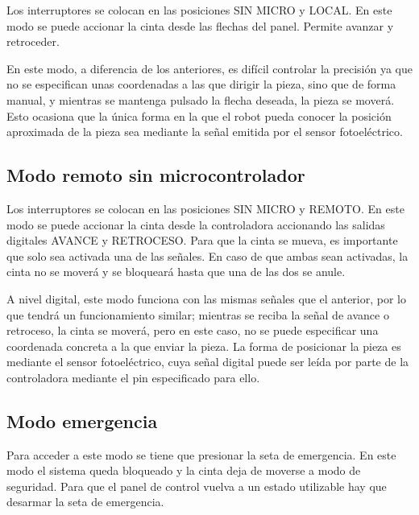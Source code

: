 Los interruptores se colocan en las posiciones SIN MICRO y LOCAL. En este modo se puede accionar la cinta desde las flechas del panel. Permite avanzar y retroceder.

En este modo, a diferencia de los anteriores, es difícil controlar la precisión ya que no se especifican unas coordenadas a las que dirigir la pieza, sino que de forma manual, y mientras se mantenga pulsado la flecha deseada, la pieza se moverá. Esto ocasiona que la única forma en la que el robot pueda conocer la posición aproximada de la pieza sea mediante la señal emitida por el sensor fotoeléctrico.

\subsection{Modo remoto sin microcontrolador}

Los interruptores se colocan en las posiciones SIN MICRO y REMOTO. En este modo se puede accionar la cinta desde la controladora accionando las salidas digitales AVANCE y RETROCESO. Para que la cinta se mueva, es importante que solo sea activada una de las señales. En caso de que ambas sean activadas, la cinta no se moverá y se bloqueará hasta que una de las dos se anule.

A nivel digital, este modo funciona con las mismas señales que el anterior, por lo que tendrá un funcionamiento similar; mientras se reciba la señal de avance o retroceso, la cinta se moverá, pero en este caso, no se puede especificar una coordenada concreta a la que enviar la pieza. La forma de posicionar la pieza es mediante el sensor fotoeléctrico, cuya señal digital puede ser leída por parte de la controladora mediante el pin especificado para ello.

\subsection{Modo emergencia}

Para acceder a este modo se tiene que presionar la seta de emergencia. En este modo el sistema queda bloqueado y la cinta deja de moverse a modo de seguridad. Para que el panel de control vuelva a un estado utilizable hay que desarmar la seta de emergencia.




